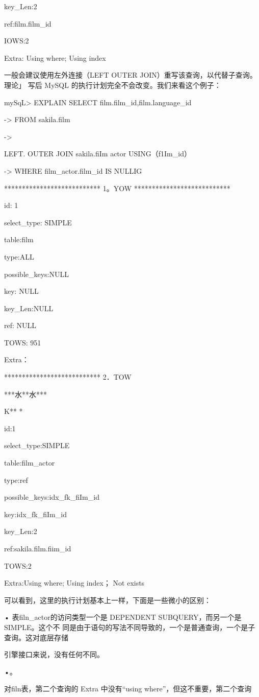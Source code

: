 key\_Len:2

ref:film.film\_id

IOWS:2

Extra: Using where; Using index

一般会建议使用左外连接（LEFT OUTER JOIN）重写该查询，以代替子查询。理论」
写后 MySQL 的执行计划完全不会改变。我们来看这个例子：

mySqL> EXPLAIN SELECT film.film\_id,film.language\_id

-> FROM sakila.film

->

LEFT. OUTER JOIN sakila.fiIm actor USING（f1Im\_id）

-> WHERE film\_actor.film\_id IS NULLIG

*************************** 1。YOW ***************************

id: 1

select\_type: SIMPLE

table:film

type:ALL

possible\_keys:NULL

key: NULL

key\_Len:NULL

ref: NULL

TOWS: 951

Extra：

*************************** 2．TOW

***水**水***

K** *

id:1

select\_type:SIMPLE

table:film\_actor

type:ref

possible\_keys:idx\_fk\_fiIm\_id

key:idx\_fk\_fiIm\_id

key\_Len:2

ref:sakila.film.fiim\_id

TOWS:2

Extra:Using where; Using index； Not exists

可以看到，这里的执行计划基本上一样，下面是一些微小的区别：

• 表filn\_actor的访问类型一个是 DEPENDENT SUBQUERY，而另一个是SIMPLE。这个不
同是由于语句的写法不同导致的，一个是普通查询，一个是子查询。这对底层存储

引擎接口来说，没有任何不同。

•。

对filn表，第二个查询的 Extra 中没有“using where”，但这不重要，第二个查询

